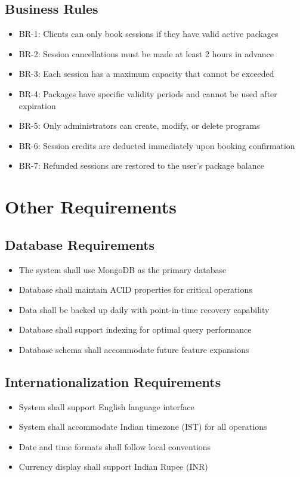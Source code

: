 \documentclass[12pt,a4paper]{article}
\begin{document}
\subsection{Business Rules}
\begin{itemize}
    \item BR-1: Clients can only book sessions if they have valid active packages
    \item BR-2: Session cancellations must be made at least 2 hours in advance
    \item BR-3: Each session has a maximum capacity that cannot be exceeded
    \item BR-4: Packages have specific validity periods and cannot be used after expiration
    \item BR-5: Only administrators can create, modify, or delete programs
    \item BR-6: Session credits are deducted immediately upon booking confirmation
    \item BR-7: Refunded sessions are restored to the user's package balance
\end{itemize}

\section{Other Requirements}

\subsection{Database Requirements}
\begin{itemize}
    \item The system shall use MongoDB as the primary database
    \item Database shall maintain ACID properties for critical operations
    \item Data shall be backed up daily with point-in-time recovery capability
    \item Database shall support indexing for optimal query performance
    \item Database schema shall accommodate future feature expansions
\end{itemize}

\subsection{Internationalization Requirements}
\begin{itemize}
    \item System shall support English language interface
    \item System shall accommodate Indian timezone (IST) for all operations
    \item Date and time formats shall follow local conventions
    \item Currency display shall support Indian Rupee (INR)
\end{itemize}
\end{document}
